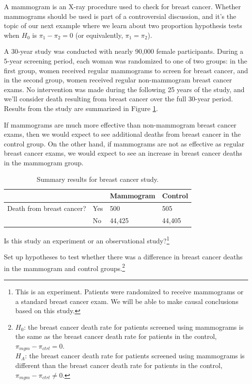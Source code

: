 \documentclass[
  10pt,
  openany]{book}
\theoremstyle{definition}
\theoremstyle{definition}
\theoremstyle{definition}
\theoremstyle{definition}
\theoremstyle{remark}
\begin{document}
 

A mammogram is an X-ray procedure used to check for breast cancer. Whether mammograms should be used is part of a controversial discussion, and it's the topic of our next example where we learn about two proportion hypothesis tests when \(H_0\) is \(\pi_1 - \pi_2 = 0\) (or equivalently, \(\pi_1 = \pi_2\)).

A 30-year study was conducted with nearly 90,000 female participants. During a 5-year screening period, each woman was randomized to one of two groups: in the first group, women received regular mammograms to screen for breast cancer, and in the second group, women received regular non-mammogram breast cancer exams. No intervention was made during the following 25 years of the study, and we'll consider death resulting from breast cancer over the full 30-year period. Results from the study are summarized in Figure \ref{tab:mammogramStudySummaryTable}.

If mammograms are much more effective than non-mammogram breast cancer exams, then we would expect to see additional deaths from breast cancer in the control group. On the other hand, if mammograms are not as effective as regular breast cancer exams, we would expect to see an increase in breast cancer deaths in the mammogram group.

\begin{table}
\centering
\caption{\label{tab:mammogramStudySummaryTable}Summary results for breast cancer study.}
\centering
\begin{tabular}[t]{l|l|l|l}
\hline
 &  & Mammogram & Control\\
\hline
Death from breast cancer? & Yes & 500 & 505\\
\hline
 & No & 44,425 & 44,405\\
\hline
\end{tabular}
\end{table}

Is this study an experiment or an observational study?\footnote{This is an experiment. Patients were randomized to receive mammograms or a standard breast cancer exam. We will be able to make causal conclusions based on this study.}

Set up hypotheses to test whether there was a difference in breast cancer deaths in the mammogram and control groups.\footnote{\(H_0\): the breast cancer death rate for patients screened using mammograms is the same as the breast cancer death rate for patients in the control, \(\pi_{mgm} - \pi_{ctrl} = 0\).\\
  \(H_A\): the breast cancer death rate for patients screened using mammograms is different than the breast cancer death rate for patients in the control, \(\pi_{mgm} - \pi_{ctrl} \neq 0\).}
\end{document}
